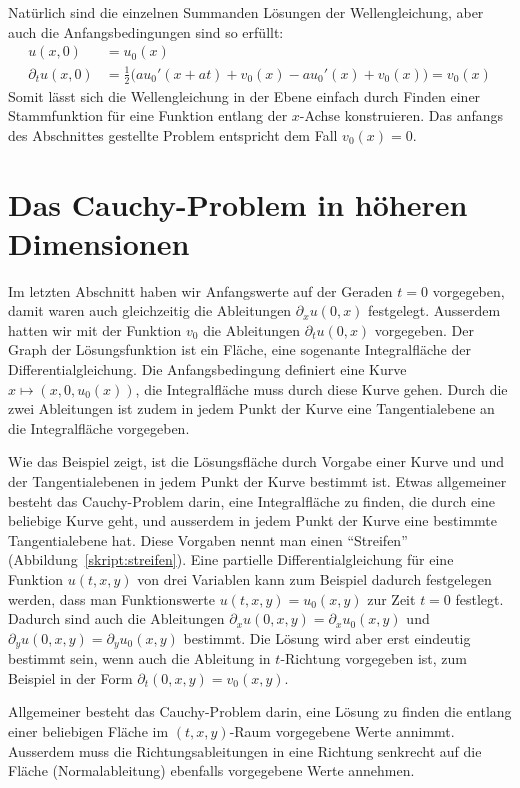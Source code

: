 Natürlich sind die einzelnen Summanden Lösungen der Wellengleichung, aber auch
die Anfangsbedingungen sind so erfüllt:
\begin{align*}
u(x,0)&=u_0(x)\\
\partial_tu(x,0)&=\frac12\bigl(au_0'(x+at)+v_0(x)-au_0'(x)+v_0(x)\bigr) =v_0(x)
\end{align*}
Somit lässt sich die Wellengleichung in der Ebene einfach durch Finden einer
Stammfunktion für eine Funktion entlang der $x$-Achse konstruieren.
Das anfangs des Abschnittes
gestellte Problem entspricht dem Fall $v_0(x)=0$.

\section{Das Cauchy-Problem in höheren Dimensionen}
Im letzten Abschnitt haben wir Anfangswerte auf der Geraden $t=0$
vorgegeben, damit waren auch gleichzeitig die Ableitungen 
$\partial_x u(0,x)$ festgelegt. Ausserdem hatten wir mit der Funktion $v_0$
die Ableitungen $\partial_t u(0,x)$ vorgegeben.
Der Graph der Lösungsfunktion ist ein Fläche, eine sogenante
Integralfläche der Differentialgleichung. Die Anfangsbedingung
definiert eine Kurve $x\mapsto(x,0,u_0(x))$, die Integralfläche muss
durch diese Kurve gehen.
Durch die zwei Ableitungen ist zudem in jedem Punkt der Kurve
eine Tangentialebene an die Integralfläche vorgegeben.

Wie das Beispiel zeigt, ist die Lösungsfläche durch Vorgabe einer Kurve und
und der Tangentialebenen in jedem Punkt der Kurve bestimmt ist.
Etwas allgemeiner besteht das Cauchy-Problem darin, eine Integralfläche
zu finden, die durch eine beliebige Kurve geht, und ausserdem in jedem Punkt
der Kurve eine bestimmte Tangentialebene hat. Diese Vorgaben nennt man
einen ``Streifen'' (Abbildung~\ref{skript:streifen}).
Eine partielle Differentialgleichung für eine Funktion $u(t,x,y)$
von drei Variablen kann zum Beispiel dadurch festgelegen werden,
dass man Funktionswerte $u(t,x,y)=u_0(x,y)$ zur Zeit $t=0$ festlegt.
Dadurch sind auch die Ableitungen $\partial_x u(0,x,y)=\partial_xu_0(x,y)$
und $\partial_y u(0,x,y)=\partial_y u_0(x,y)$ bestimmt. Die Lösung wird
aber erst eindeutig bestimmt sein, wenn auch die Ableitung in $t$-Richtung
vorgegeben ist, zum Beispiel in der Form $\partial_t(0,x,y)=v_0(x,y)$.

Allgemeiner besteht das Cauchy-Problem darin, eine Lösung zu finden
die entlang einer beliebigen Fläche im $(t,x,y)$-Raum vorgegebene
Werte annimmt. Ausserdem muss die Richtungsableitungen in eine Richtung
senkrecht auf die Fläche (Normalableitung) ebenfalls vorgegebene Werte annehmen.


